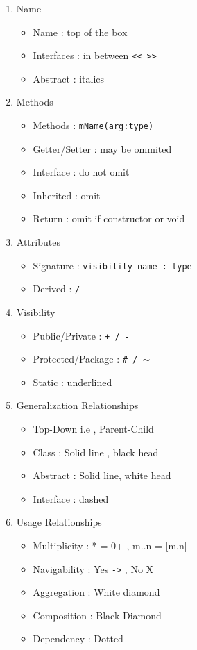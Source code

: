 	\begin{enumerate}
		\item Name
				\begin{itemize}
						\item Name : top of the box
						\item Interfaces : in between \texttt{<< >>}
						\item Abstract : italics
				\end{itemize}
		\item Methods
				\begin{itemize}
						\item Methods : \texttt{mName(arg:type)}
						\item Getter/Setter : may be ommited
						\item Interface : do not omit
						\item Inherited : omit
						\item Return : omit if constructor or void
				\end{itemize}
		\item Attributes
				\begin{itemize}
						\item Signature : \texttt{visibility name : type}
						\item Derived : \texttt{/}~
				\end{itemize}
		\item Visibility
				\begin{itemize}
						\item Public/Private : \texttt{+ / -} 
						\item Protected/Package : \texttt{\# / $\sim$}
						\item Static : underlined
				\end{itemize}	
		\item Generalization Relationships
				\begin{itemize}
						\item Top-Down i.e , Parent-Child
						\item Class : Solid line , black head
						\item Abstract : Solid line, white head
						\item Interface : dashed
				\end{itemize}
		\item Usage Relationships
				\begin{itemize}
						\item Multiplicity : * = 0+ , m..n = [m,n]
						\item Navigability : Yes \texttt{->} , No X
						\item Aggregation : White diamond
						\item Composition : Black Diamond
						\item Dependency : Dotted 
				\end{itemize}
	\end{enumerate}

